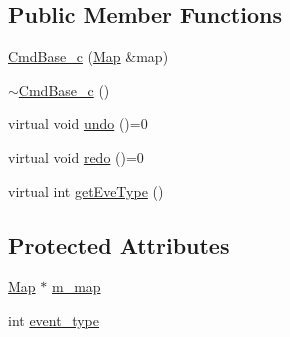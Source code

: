 \subsection*{Public Member Functions}
\begin{DoxyCompactItemize}
\item 
\hyperlink{class_cmd_base__c_a2f11354ded469c6caab3eb91b9bc5da2}{Cmd\+Base\+\_\+c} (\hyperlink{class_map}{Map} \&map)
\item 
\hyperlink{class_cmd_base__c_a8d33b988bc598aa99ec716477d538fc7}{$\sim$\+Cmd\+Base\+\_\+c} ()
\item 
virtual void \hyperlink{class_cmd_base__c_ae68d28d330d9cd8e93ea9688590ff966}{undo} ()=0
\item 
virtual void \hyperlink{class_cmd_base__c_ad774c1a7af7d278cb1d72e7e663b4738}{redo} ()=0
\item 
virtual int \hyperlink{class_cmd_base__c_a9a9437116dec340c4e65f02181a97b2e}{get\+Eve\+Type} ()
\end{DoxyCompactItemize}
\subsection*{Protected Attributes}
\begin{DoxyCompactItemize}
\item 
\hyperlink{class_map}{Map} $\ast$ \hyperlink{class_cmd_base__c_ac9697d946dd6d470fe6933904ff057e6}{m\+\_\+map}
\item 
int \hyperlink{class_cmd_base__c_a20e2061e49434fe75eeeb5fc75e4a448}{event\+\_\+type}
\end{DoxyCompactItemize}


